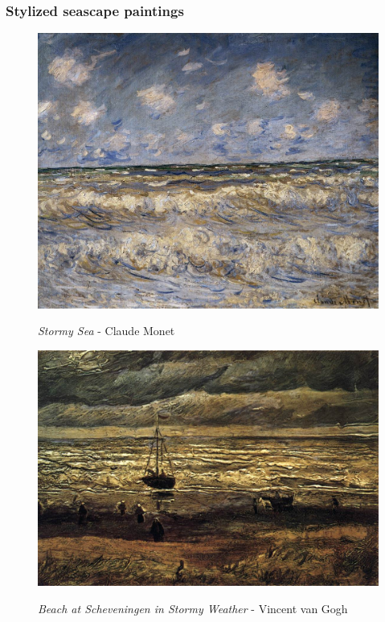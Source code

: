 \documentclass[a4paper]{article}
\begin{document}
\subsubsection{Stylized seascape paintings}
\begin {figure}[h!]
\centering
\begin{minipage}[b]{.49\textwidth}
	\centering
	\includegraphics[width=\textwidth]{SeaPaintings/S1monetstormysea.jpg}
	\caption{\emph{Stormy Sea} - Claude Monet}
\end{minipage}
\hfill
\begin{minipage}[b]{.49\textwidth}
	\centering
	\includegraphics[width=\textwidth]{SeaPaintings/S2vangoghbeachscheveningenstormyweather.jpg}
    \caption{\emph{Beach at Scheveningen in Stormy Weather} - Vincent van Gogh}
\end{minipage}
\end{figure}
\end{document}
